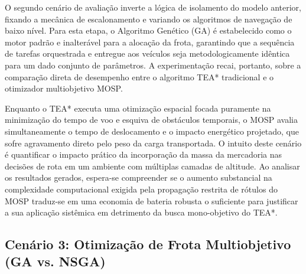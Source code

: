 O segundo cenário de avaliação inverte a lógica de isolamento do modelo anterior, fixando a mecânica de escalonamento e variando os algoritmos de navegação de baixo nível.
Para esta etapa, o Algoritmo Genético (GA) é estabelecido como o motor padrão e inalterável para a alocação da frota, garantindo que a sequência de tarefas orquestrada e entregue aos veículos seja metodologicamente idêntica para um dado conjunto de parâmetros.
A experimentação recai, portanto, sobre a comparação direta de desempenho entre o algoritmo TEA* tradicional e o otimizador multiobjetivo MOSP.

Enquanto o TEA* executa uma otimização espacial focada puramente na minimização do tempo de voo e esquiva de obstáculos temporais, o MOSP avalia simultaneamente o tempo de deslocamento e o impacto energético projetado, que sofre agravamento direto pelo peso da carga transportada.
O intuito deste cenário é quantificar o impacto prático da incorporação da massa da mercadoria nas decisões de rota em um ambiente com múltiplas camadas de altitude.
Ao analisar os resultados gerados, espera-se compreender se o aumento substancial na complexidade computacional exigida pela propagação restrita de rótulos do MOSP traduz-se em uma economia de bateria robusta o suficiente para justificar a sua aplicação sistêmica em detrimento da busca mono-objetivo do TEA*.

\subsection{Cenário 3: Otimização de Frota Multiobjetivo (GA vs. NSGA)}

